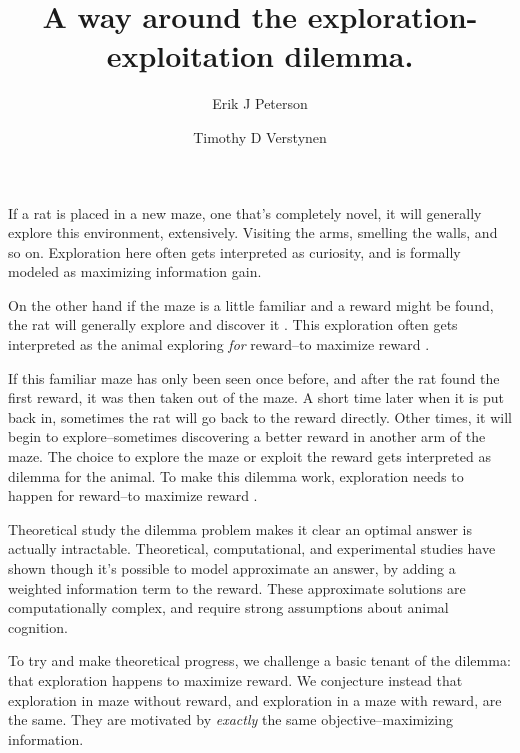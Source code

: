 \documentclass[9pt,twocolumn,twoside]{pnas-new}
\title{A way around the exploration-exploitation dilemma.}
\author[a,1]{Erik J Peterson}
\author[a,b]{Timothy D Verstynen}
\affil[a]{Department of Psychology}
\affil[b]{Center for the Neural Basis of Cognition, Carnegie Mellon University, Pittsburgh PA}
\begin{document}
\verticaladjustment{-2pt}
\maketitle


\thispagestyle{firststyle}
If a rat is placed in a new maze, one that's completely novel, it will generally explore this environment, extensively. Visiting the arms, smelling the walls, and so on. Exploration here often gets interpreted as curiosity, and is formally modeled as maximizing information gain.

On the other hand if the maze is a little familiar and a reward might be found, the rat will generally explore and discover it \cite{Todd2015}. This exploration often gets interpreted as the animal exploring \textit{for} reward--to maximize reward \cite{Sutton2018}. 

If this familiar maze has only been seen once before, and after the rat found the first reward, it was then taken out of the maze. A short time later when it is put back in, sometimes the rat will go back to the reward directly. Other times, it will begin to explore--sometimes discovering a better reward in another arm of the maze. The choice to explore the maze or exploit the reward gets interpreted as dilemma for the animal. To make this dilemma work, exploration needs to happen for reward--to maximize reward \cite{Sutton2018}. 

Theoretical study the dilemma problem makes it clear an optimal answer is actually intractable. Theoretical, computational, and experimental studies have shown though it's possible to model approximate an answer, by adding a weighted information term to the reward. These approximate solutions are computationally complex, and require strong assumptions about animal cognition. 

To try and make theoretical progress, we challenge a basic tenant of the dilemma: that exploration happens to maximize reward. We conjecture instead that exploration in maze without reward, and exploration in a maze with reward, are the same. They are motivated by \textit{exactly} the same objective--maximizing information. 
\end{document}
